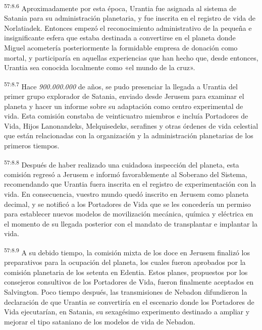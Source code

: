 \par
\textsuperscript{57:8.6} Aproximadamente por esta época, Urantia fue asignada al sistema de Satania para su administración planetaria, y fue inscrita en el registro de vida de Norlatiadek. Entonces empezó el reconocimiento administrativo de la pequeña e insignificante esfera que estaba destinada a convertirse en el planeta donde Miguel acometería posteriormente la formidable empresa de donación como mortal, y participaría en aquellas experiencias que han hecho que, desde entonces, Urantia sea conocida localmente como «el mundo de la cruz».

\par
\textsuperscript{57:8.7} Hace \textit{900.000.000} de años, se pudo presenciar la llegada a Urantia del primer grupo explorador de Satania, enviado desde Jerusem para examinar el planeta y hacer un informe sobre su adaptación como centro experimental de vida. Esta comisión constaba de veinticuatro miembros e incluía Portadores de Vida, Hijos Lanonandeks, Melquisedeks, serafines y otras órdenes de vida celestial que están relacionadas con la organización y la administración planetarias de los primeros tiempos.

\par
\textsuperscript{57:8.8} Después de haber realizado una cuidadosa inspección del planeta, esta comisión regresó a Jerusem e informó favorablemente al Soberano del Sistema, recomendando que Urantia fuera inscrita en el registro de experimentación con la vida. En consecuencia, vuestro mundo quedó inscrito en Jerusem como planeta decimal, y se notificó a los Portadores de Vida que se les concedería un permiso para establecer nuevos modelos de movilización mecánica, química y eléctrica en el momento de su llegada posterior con el mandato de transplantar e implantar la vida.

\par
\textsuperscript{57:8.9} A su debido tiempo, la comisión mixta de los doce en Jerusem finalizó los preparativos para la ocupación del planeta, los cuales fueron aprobados por la comisión planetaria de los setenta en Edentia. Estos planes, propuestos por los consejeros consultivos de los Portadores de Vida, fueron finalmente aceptados en Salvington. Poco tiempo después, las transmisiones de Nebadon difundieron la declaración de que Urantia se convertiría en el escenario donde los Portadores de Vida ejecutarían, en Satania, su sexagésimo experimento destinado a ampliar y mejorar el tipo sataniano de los modelos de vida de Nebadon.

